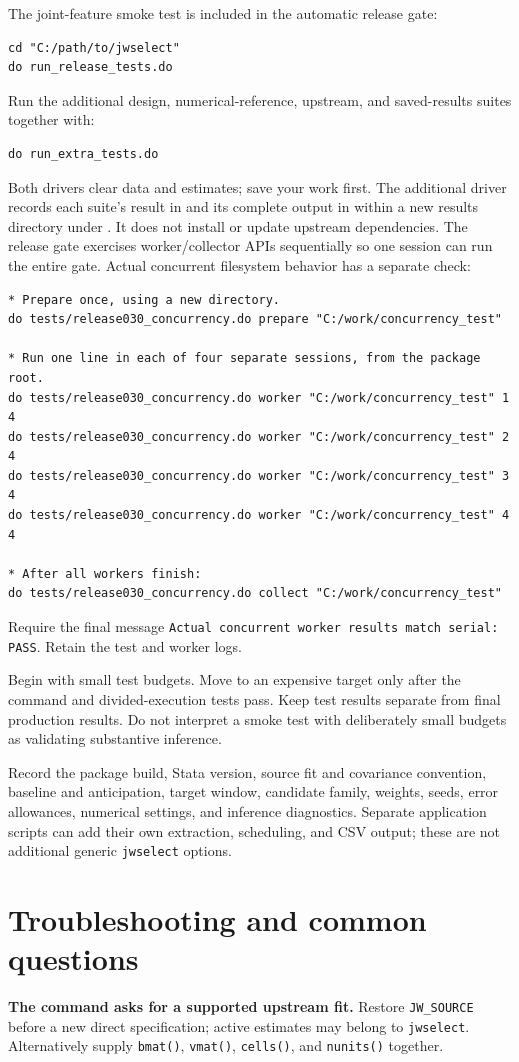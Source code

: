 \documentclass[11pt]{article}
\newcommand{\cmd}[1]{\texttt{#1}}
\begin{document}
The joint-feature smoke test is included in the automatic release gate:
\begin{lstlisting}
cd "C:/path/to/jwselect"
do run_release_tests.do
\end{lstlisting}
Run the additional design, numerical-reference, upstream, and saved-results
suites together with:
\begin{lstlisting}
do run_extra_tests.do
\end{lstlisting}
Both drivers clear data and estimates; save your work first. The additional
driver records each suite's result in  and its complete
output in  within a new results directory under
. It does not install or update upstream dependencies.
The release gate exercises worker/collector APIs sequentially so one session
can run the entire gate. Actual concurrent filesystem behavior has a separate check:
\begin{lstlisting}
* Prepare once, using a new directory.
do tests/release030_concurrency.do prepare "C:/work/concurrency_test"

* Run one line in each of four separate sessions, from the package root.
do tests/release030_concurrency.do worker "C:/work/concurrency_test" 1 4
do tests/release030_concurrency.do worker "C:/work/concurrency_test" 2 4
do tests/release030_concurrency.do worker "C:/work/concurrency_test" 3 4
do tests/release030_concurrency.do worker "C:/work/concurrency_test" 4 4

* After all workers finish:
do tests/release030_concurrency.do collect "C:/work/concurrency_test"
\end{lstlisting}
Require the final message \cmd{Actual concurrent worker results match serial:
PASS}. Retain the test and worker logs.

Begin with small test budgets. Move to an expensive target only after the command and divided-execution tests pass. Keep test results separate
from final production results. Do not interpret a smoke test with deliberately
small budgets as validating substantive inference.

Record the package build, Stata version, source fit and covariance convention,
baseline and anticipation, target window, candidate family, weights, seeds,
error allowances, numerical settings, and inference diagnostics. Separate
application scripts can add their own extraction, scheduling, and CSV output;
these are not additional generic \cmd{jwselect} options.

\section{Troubleshooting and common questions}
\begingroup\setlength{\parskip}{3pt}
\textbf{The command asks for a supported upstream fit.}
Restore \cmd{JW\_SOURCE} before a new direct specification; active estimates
may belong to \cmd{jwselect}. Alternatively supply \cmd{bmat()},
\cmd{vmat()}, \cmd{cells()}, and \cmd{nunits()} together.
\end{document}
